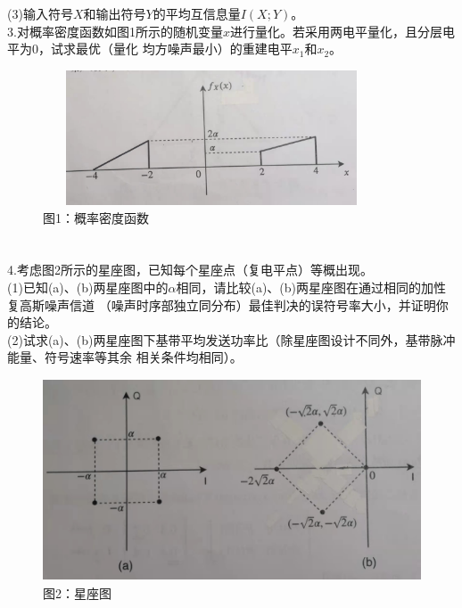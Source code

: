 \documentclass[UTF8]{ctexart}
\begin{document}
(3)输入符号$X$和输出符号$Y$的平均互信息量$I(X;Y)$。\\
3.对概率密度函数如图1所示的随机变量$x$进行量化。若采用两电平量化，且分层电平为0，试求最优（量化
均方噪声最小）的重建电平$x_1$和$x_2$。\\
\begin{figure}[H]
  \centering
  \includegraphics[width=10cm,height=4cm]{1.jpg}
  \caption*{图1：概率密度函数}
\end{figure}
\section*{}
4.考虑图2所示的星座图，已知每个星座点（复电平点）等概出现。\\
(1)已知(a)、(b)两星座图中的$\alpha$相同，请比较(a)、(b)两星座图在通过相同的加性复高斯噪声信道
（噪声时序部独立同分布）最佳判决的误符号率大小，并证明你的结论。\\
(2)试求(a)、(b)两星座图下基带平均发送功率比（除星座图设计不同外，基带脉冲能量、符号速率等其余
相关条件均相同）。\\
\begin{figure}[H]
  \centering
  \includegraphics[width=12cm,height=6cm]{2.jpg}
  \caption*{图2：星座图}
\end{figure}
\end{document}
